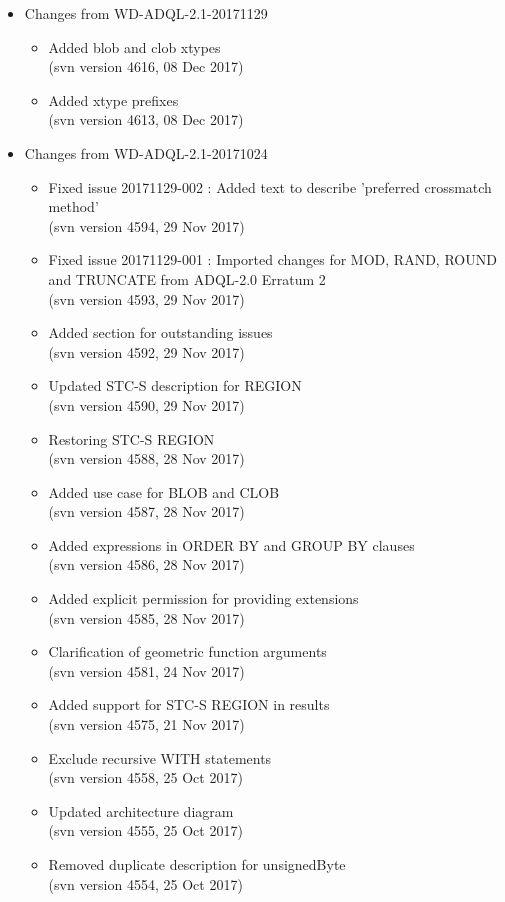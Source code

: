 \documentclass[11pt,a4paper]{ivoa}
\begin{document}
\begin{itemize}
    \item Changes from WD-ADQL-2.1-20171129
        \begin{itemize}
            \item Added blob and clob xtypes\\
            (svn version 4616, 08 Dec 2017)
            \item Added xtype prefixes\\
            (svn version 4613, 08 Dec 2017)
        \end{itemize}

    \item Changes from WD-ADQL-2.1-20171024
        \begin{itemize}
            \item Fixed issue 20171129-002 : Added text to describe 'preferred crossmatch method'\\
            (svn version 4594, 29 Nov 2017)
            \item Fixed issue 20171129-001 : Imported changes for MOD, RAND, ROUND and TRUNCATE from ADQL-2.0 Erratum 2\\
            (svn version 4593, 29 Nov 2017)
            \item Added section for outstanding issues\\
            (svn version 4592, 29 Nov 2017)
            \item Updated STC-S description for REGION\\
            (svn version 4590, 29 Nov 2017)
            \item Restoring STC-S REGION\\
            (svn version 4588, 28 Nov 2017)
            \item Added use case for BLOB and CLOB\\
            (svn version 4587, 28 Nov 2017)
            \item Added expressions in ORDER BY and GROUP BY clauses\\
            (svn version 4586, 28 Nov 2017)
            \item Added explicit permission for providing extensions\\
            (svn version 4585, 28 Nov 2017)
            \item Clarification of geometric function arguments\\
            (svn version 4581, 24 Nov 2017)
            \item Added support for STC-S REGION in results\\
            (svn version 4575, 21 Nov 2017)
            \item Exclude recursive WITH statements\\
            (svn version 4558, 25 Oct 2017)
            \item Updated architecture diagram\\
            (svn version 4555, 25 Oct 2017)
            \item Removed duplicate description for unsignedByte\\
            (svn version 4554, 25 Oct 2017)
        \end{itemize}


\end{itemize}
\end{document}
